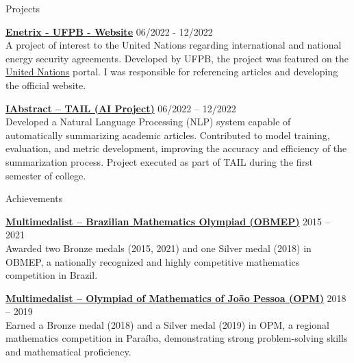 \documentclass{resume}
\begin{document}

\begin{rSection}{Projects}

\item \textbf{\href{https://enetrix.ufpb.br/}{Enetrix - UFPB - Website}} \hfill 06/2022 - 12/2022 \\
A project of interest to the United Nations regarding international and national energy security agreements. Developed by UFPB, the project was featured on the \href{https://www.un.org/en/academic-impact/insights-energy-diplomacy-and-un-data-intensive-research-brazilian-universities}{United Nations} portal. I was responsible for referencing articles and developing the official website.

\item \textbf{\href{https://github.com/ralfferreira/generate-abstract}{IAbstract – TAIL (AI Project)}} \hfill 06/2022 – 12/2022 \\
Developed a Natural Language Processing (NLP) system capable of automatically summarizing academic articles. Contributed to model training, evaluation, and metric development, improving the accuracy and efficiency of the summarization process. Project executed as part of TAIL during the first semester of college.


\end{rSection}


\begin{rSection}{Achievements}

\item \textbf{\href{http://www.obmep.org.br/}{Multimedalist – Brazilian Mathematics Olympiad (OBMEP)}} \hfill 2015 – 2021 \\
Awarded two Bronze medals (2015, 2021) and one Silver medal (2018) in OBMEP, a nationally recognized and highly competitive mathematics competition in Brazil.

\item \textbf{\href{http://www.mat.ufpb.br/opm/}{Multimedalist – Olympiad of Mathematics of João Pessoa (OPM)}} \hfill 2018 – 2019 \\
Earned a Bronze medal (2018) and a Silver medal (2019) in OPM, a regional mathematics competition in Paraíba, demonstrating strong problem-solving skills and mathematical proficiency.

\end{rSection}
\end{document}
